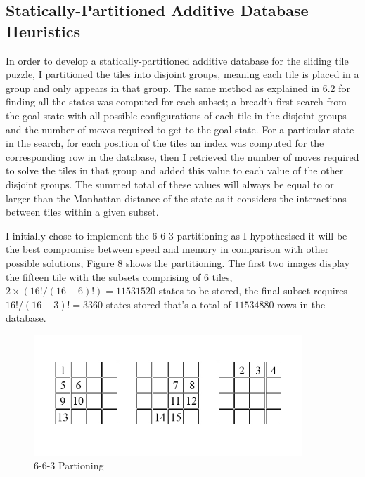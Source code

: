 \documentclass[final]{cmpreport}
\begin{document}
\subsection{Statically-Partitioned Additive Database Heuristics}
In order to develop a statically-partitioned additive database for the sliding tile puzzle, I partitioned the tiles into disjoint groups, meaning each tile is placed in a group and only appears in that group. The same method as explained in 6.2 for finding all the states was computed for each subset; a breadth-first search from the goal state with all possible configurations of each tile in the disjoint groups and the number of moves required to get to the goal state. For a particular state in the search, for each position of the tiles an index was computed for the corresponding row in the database, then I retrieved the number of moves required to solve the tiles in that group and added this value to each value of the other disjoint groups. The summed total of these values will always be equal to or larger than the Manhattan distance of the state as it considers the interactions between tiles within a given subset.	

I initially chose to implement the 6-6-3 partitioning as I hypothesised it will be the best compromise between speed and memory in comparison with other possible solutions, Figure 8 shows the partitioning. The first two images display the fifteen tile with the subsets comprising of 6 tiles, $2\times(16!/(16-6)!)= 11531520$ states to be stored, the final subset requires $16!/(16-3)!=3360$ states stored that's a total of $11534880$ rows in the database. 


\begin{figure}[ht]
	\centering
	\includegraphics[width=0.9\textwidth]{15tile}
	\captionsetup{justification=centering}
	\caption{6-6-3 Partioning}
\end{figure}
\end{document}
